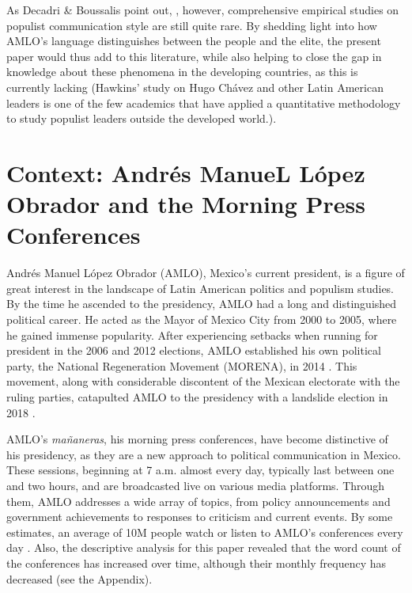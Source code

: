 \documentclass[]{article}
\begin{document}
As Decadri \& Boussalis point out, \cite{decadri_populism_2020}, however, comprehensive empirical studies on populist communication style are still quite rare. By shedding light into how AMLO's language distinguishes between the people and the elite, the present paper would thus add to this literature, while also helping to close the gap in knowledge about these phenomena in the developing countries, as this is currently lacking (Hawkins' \cite{hawkins_is_2009} study on Hugo Chávez and other Latin American leaders is one of the few academics that have applied a quantitative methodology to study populist leaders outside the developed world.). 

\section{Context: Andrés ManueL López Obrador and the Morning Press Conferences}

Andrés Manuel López Obrador (AMLO), Mexico's current president, is a figure of great interest in the landscape of Latin American politics and populism studies. By the time he ascended to the presidency, AMLO had a long and distinguished political career. He acted as the Mayor of Mexico City from 2000 to 2005, where he gained immense popularity. After experiencing setbacks when running for president in the 2006 and 2012 elections, AMLO established his own political party, the National Regeneration Movement (MORENA), in 2014 \cite{navarrete_vela_morena_2019}. This movement, along with considerable discontent of the Mexican electorate with the ruling parties, catapulted AMLO to the presidency with a landslide election in 2018 \cite{moreno_viraje_nodate}. 

AMLO's \textit{mañaneras}, his morning press conferences, have become distinctive of his presidency, as they are a new approach to political communication in Mexico. These sessions, beginning at 7 a.m. almost every day, typically last between one and two hours, and are broadcasted live on various media platforms. Through them, AMLO addresses a wide array of topics, from policy announcements and government achievements to responses to criticism and current events. By some estimates, an average of 10M people watch or listen to AMLO's conferences every day \cite{bravo_5_2024}. Also, the descriptive analysis for this paper revealed that the word count of the conferences has increased over time, although their monthly frequency has decreased (see the Appendix). 
\end{document}
